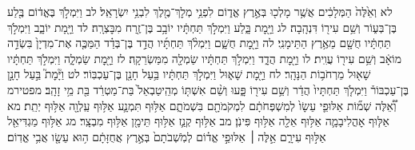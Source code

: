 \documentclass[twoside, openany, parskip=half, 11pt]{book}
\begin{document}
לא וְאֵ֙לֶּה֙ הַמְּלָכִ֔ים אֲשֶׁ֥ר מָלְכ֖וּ בְּאֶ֣רֶץ אֱד֑וֹם לִפְנֵ֥י מְלׇךְ־מֶ֖לֶךְ לִבְנֵ֥י יִשְׂרָאֵֽל׃ לב וַיִּמְלֹ֣ךְ בֶּאֱד֔וֹם בֶּ֖לַע בֶּן־בְּע֑וֹר וְשֵׁ֥ם עִיר֖וֹ דִּנְהָֽבָה׃ לג וַיָּ֖מׇת בָּ֑לַע וַיִּמְלֹ֣ךְ תַּחְתָּ֔יו יוֹבָ֥ב בֶּן־זֶ֖רַח מִבׇּצְרָֽה׃ לד וַיָּ֖מָת יוֹבָ֑ב וַיִּמְלֹ֣ךְ תַּחְתָּ֔יו חֻשָׁ֖ם מֵאֶ֥רֶץ הַתֵּימָנִֽי׃ לה וַיָּ֖מׇת חֻשָׁ֑ם וַיִּמְלֹ֨ךְ תַּחְתָּ֜יו הֲדַ֣ד בֶּן־בְּדַ֗ד הַמַּכֶּ֤ה אֶת־מִדְיָן֙ בִּשְׂדֵ֣ה מוֹאָ֔ב וְשֵׁ֥ם עִיר֖וֹ עֲוִֽית׃ לו וַיָּ֖מׇת הֲדָ֑ד וַיִּמְלֹ֣ךְ תַּחְתָּ֔יו שַׂמְלָ֖ה מִמַּשְׂרֵקָֽה׃ לז וַיָּ֖מׇת שַׂמְלָ֑ה וַיִּמְלֹ֣ךְ תַּחְתָּ֔יו שָׁא֖וּל מֵרְחֹב֥וֹת הַנָּהָֽר׃ לח וַיָּ֖מׇת שָׁא֑וּל וַיִּמְלֹ֣ךְ תַּחְתָּ֔יו בַּ֥עַל חָנָ֖ן בֶּן־עַכְבּֽוֹר׃ לט וַיָּ֘מׇת֮ בַּ֣עַל חָנָ֣ן בֶּן־עַכְבּוֹר֒ וַיִּמְלֹ֤ךְ תַּחְתָּיו֙ הֲדַ֔ר וְשֵׁ֥ם עִיר֖וֹ פָּ֑עוּ וְשֵׁ֨ם אִשְׁתּ֤וֹ מְהֵֽיטַבְאֵל֙ בַּת־מַטְרֵ֔ד בַּ֖ת מֵ֥י זָהָֽב׃ מפטירמ וְ֠אֵ֠לֶּה שְׁמ֞וֹת אַלּוּפֵ֤י עֵשָׂו֙ לְמִשְׁפְּחֹתָ֔ם לִמְקֹמֹתָ֖ם בִּשְׁמֹתָ֑ם אַלּ֥וּף תִּמְנָ֛ע אַלּ֥וּף עַֽלְוָ֖ה אַלּ֥וּף יְתֵֽת׃ מא אַלּ֧וּף אׇהֳלִיבָמָ֛ה אַלּ֥וּף אֵלָ֖ה אַלּ֥וּף פִּינֹֽן׃ מב אַלּ֥וּף קְנַ֛ז אַלּ֥וּף תֵּימָ֖ן אַלּ֥וּף מִבְצָֽר׃ מג אַלּ֥וּף מַגְדִּיאֵ֖ל אַלּ֣וּף עִירָ֑ם אֵ֣לֶּה ׀ אַלּוּפֵ֣י אֱד֗וֹם לְמֹֽשְׁבֹתָם֙ בְּאֶ֣רֶץ אֲחֻזָּתָ֔ם ה֥וּא עֵשָׂ֖ו אֲבִ֥י אֱדֽוֹם׃
\end{document}
